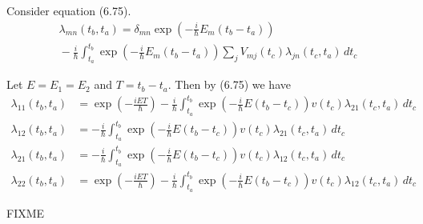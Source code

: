 


Consider equation (6.75).
\begin{multline*}
\lambda_{mn}(t_b,t_a)=\delta_{mn}
\exp\left(-\frac{i}{\hbar}E_m(t_b-t_a)\right)
\\
{}-\frac{i}{\hbar}
\int_{t_a}^{t_b}
\exp\left(-\frac{i}{\hbar}E_m(t_b-t_a)\right)
\sum_jV_{mj}(t_c)\lambda_{jn}(t_c,t_a)\,dt_c
\tag{6.75}
\end{multline*}

Let $E=E_1=E_2$ and $T=t_b-t_a$.
Then by (6.75) we have
\begin{align*}
\lambda_{11}(t_b,t_a)&=
\exp\left(-\frac{iET}{\hbar}\right)
-\frac{i}{\hbar}
\int_{t_a}^{t_b}
\exp\left(-\frac{i}{\hbar}E(t_b-t_c)\right)
v(t_c)\lambda_{21}(t_c,t_a)\,dt_c
\\
\lambda_{12}(t_b,t_a)&=
-\frac{i}{\hbar}
\int_{t_a}^{t_b}
\exp\left(-\frac{i}{\hbar}E(t_b-t_c)\right)
v(t_c)\lambda_{21}(t_c,t_a)\,dt_c
\\
\lambda_{21}(t_b,t_a)&=
-\frac{i}{\hbar}
\int_{t_a}^{t_b}
\exp\left(-\frac{i}{\hbar}E(t_b-t_c)\right)
v(t_c)\lambda_{12}(t_c,t_a)\,dt_c
\\
\lambda_{22}(t_b,t_a)&=
\exp\left(-\frac{iET}{\hbar}\right)
-\frac{i}{\hbar}
\int_{t_a}^{t_b}
\exp\left(-\frac{i}{\hbar}E(t_b-t_c)\right)
v(t_c)\lambda_{12}(t_c,t_a)\,dt_c
\end{align*}

FIXME


